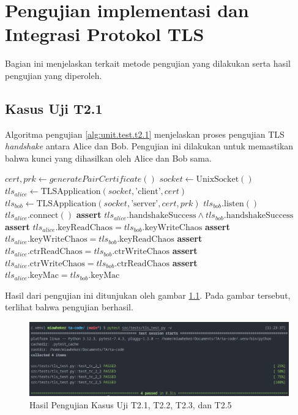 \chapter{{{Pengujian implementasi dan Integrasi Protokol TLS}}} 
\label{appendix:unit.test.tls}

Bagian ini menjelaskan terkait metode pengujian yang dilakukan serta hasil pengujian yang diperoleh.

\section{Kasus Uji T2.1}

Algoritma pengujian \ref{alg:unit.test.t2.1} menjelaskan proses pengujian TLS \emph{handshake} antara Alice dan Bob. Pengujian ini dilakukan untuk memastikan bahwa kunci yang dihasilkan oleh Alice dan Bob sama.

\begin{algorithm}
  \caption{Algoritme Pengujian Kasus Uji T2.1}
  \label{alg:unit.test.t2.1}
  \begin{algorithmic}
    \State $cert, prk \gets generatePairCertificate()$
    \State $socket \gets \text{UnixSocket}()$ 
    \State $tls_{alice} \gets \text{TLSApplication}(socket, \text{'client'}, cert)$ 
    \State $tls_{bob} \gets \text{TLSApplication}(socket, \text{'server'}, cert, prk)$
    \State
    \State $tls_{bob}.\text{listen}()$  
    \State $tls_{alice}.\text{connect}()$  
    \State
    \State \textbf{assert} $tls_{alice}.\text{handshakeSuccess} \land tls_{bob}.\text{handshakeSuccess}$
    \State \textbf{assert} $tls_{alice}.\text{keyReadChaos} = tls_{bob}.\text{keyWriteChaos}$
    \State \textbf{assert} $tls_{alice}.\text{keyWriteChaos} = tls_{bob}.\text{keyReadChaos}$
    \State \textbf{assert} $tls_{alice}.\text{ctrReadChaos} = tls_{bob}.\text{ctrWriteChaos}$
    \State \textbf{assert} $tls_{alice}.\text{ctrWriteChaos} = tls_{bob}.\text{ctrReadChaos}$
    \State \textbf{assert} $tls_{alice}.\text{keyMac} = tls_{bob}.\text{keyMac}$
  \end{algorithmic}
\end{algorithm}

Hasil dari pengujian ini ditunjukan oleh gambar \ref{fig:unit.test.t2.1}. Pada gambar tersebut, terlihat bahwa pengujian berhasil.

\begin{figure}[ht]
  \centering
  \includegraphics[width=\textwidth]{chapters/res/appendix-4/tls_test.png}
  \caption{Hasil Pengujian Kasus Uji T2.1, T2.2, T2.3, dan T2.5}
  \label{fig:unit.test.t2.1}
\end{figure}

